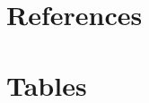 \documentclass[12pt]{article}
\numberwithin{equation}{section}
\begin{document}
\begin{comment}	
	\section{Appendix - Imperial Chinese Dynasties}
	
	\begin{tabular}{ll}
	Empire&Historical Era\\
	\hline \hline
	Qin Dynasty &221--206 BC\\
	Han Dynasty &202 BC--AD 220\\
	Wei and Jin Period &AD 265--420\\
	Wu Hu Period &AD 304--439\\
	Southern and Northern Dynasties &AD 420--589\\
	Sui Dynasty &AD 589--618\\
	Tang Dynasty &AD 618--907\\
	Five Dynasties and Ten Kingdoms &AD 907--960\\
	Song, Liao, Jin, and Western Xia Dynasties &AD 960--1234\\
	Yuan Dynasty &AD 1271--1368\\
	Ming Dynasty &AD 1368--1644\\
	Qing Dynasty &AD 1644--1911\\
	\hline
	\end{tabular}
	
\end{comment}
	\newpage
	\section*{References}
%	
		
		
		
\newpage
\section*{Tables}
\end{document}
